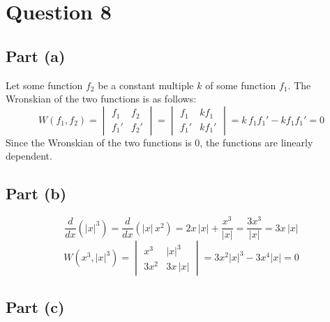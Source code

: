 \documentclass{article}
\begin{document}
\section*{Question 8}
\subsection*{Part (a)}
\begin{center}
Let some function \(f_2\) be a constant multiple \(k\) of some function \(f_1\). The Wronskian of the two functions is as follows:
\[W(f_1,f_2)=
\begin{vmatrix}
	f_1 & f_2 \\
	f_1' & f_2'
\end{vmatrix}
=
\begin{vmatrix}
	f_1 & kf_1 \\
	f_1' & kf_1'
\end{vmatrix}
=k\,f_1f_1'-kf_1f_1'=0\]
Since the Wronskian of the two functions is 0, the functions are linearly dependent.
\end{center}
\subsection*{Part (b)}
\[\frac{d}{dx}\left(|x|^3\right)=\frac{d}{dx}\left(|x|\,x^2\right)=2x\,|x|+\frac{x^3}{|x|}=\frac{3x^3}{|x|}=3x\,|x|\]
\[W\left(x^3,|x|^3\right)=
\begin{vmatrix}
	x^3 & |x|^3 \\
	3x^2 & 3x\,|x|
\end{vmatrix}
=3x^2|x|^3-3x^4|x|=\boxed{0}\]
\subsection*{Part (c)}
\end{document}
